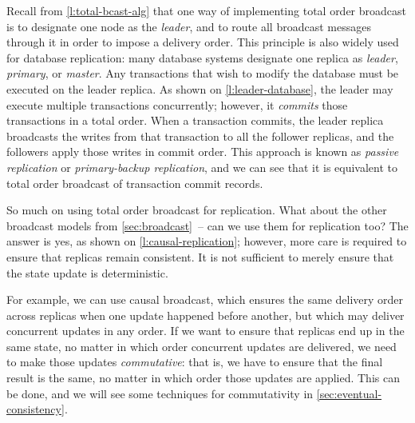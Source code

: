 Recall from \autoref{l:total-bcast-alg} that one way of implementing total order broadcast is to designate one node as the \emph{leader}, and to route all broadcast messages through it in order to impose a delivery order.
This principle is also widely used for database replication: many database systems designate one replica as \emph{leader}, \emph{primary}, or \emph{master}.
Any transactions that wish to modify the database must be executed on the leader replica.
As shown on \autoref{l:leader-database}, the leader may execute multiple transactions concurrently; however, it \emph{commits} those transactions in a total order.
When a transaction commits, the leader replica broadcasts the writes from that transaction to all the follower replicas, and the followers apply those writes in commit order.
This approach is known as \emph{passive replication} or \emph{primary-backup replication}, and we can see that it is equivalent to total order broadcast of transaction commit records.

So much on using total order broadcast for replication.
What about the other broadcast models from \autoref{sec:broadcast}~-- can we use them for replication too?
The answer is yes, as shown on \autoref{l:causal-replication}; however, more care is required to ensure that replicas remain consistent.
It is not sufficient to merely ensure that the state update is deterministic.

For example, we can use causal broadcast, which ensures the same delivery order across replicas when one update happened before another, but which may deliver concurrent updates in any order.
If we want to ensure that replicas end up in the same state, no matter in which order concurrent updates are delivered, we need to make those updates \emph{commutative}: that is, we have to ensure that the final result is the same, no matter in which order those updates are applied.
This can be done, and we will see some techniques for commutativity in \autoref{sec:eventual-consistency}.

